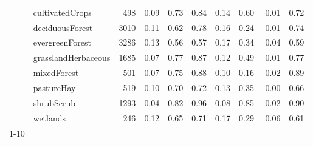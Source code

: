 \begin{tabular}{llrrrrrrrr}
 & cultivatedCrops & 498 & 0.09 & 0.73 & 0.84 & 0.14 & 0.60 & 0.01 & 0.72 \\
 & deciduousForest & 3010 & 0.11 & 0.62 & 0.78 & 0.16 & 0.24 & -0.01 & 0.74 \\
 & evergreenForest & 3286 & 0.13 & 0.56 & 0.57 & 0.17 & 0.34 & 0.04 & 0.59 \\
 & grasslandHerbaceous & 1685 & 0.07 & 0.77 & 0.87 & 0.12 & 0.49 & 0.01 & 0.77 \\
 & mixedForest & 501 & 0.07 & 0.75 & 0.88 & 0.10 & 0.16 & 0.02 & 0.89 \\
 & pastureHay & 519 & 0.10 & 0.70 & 0.72 & 0.13 & 0.35 & 0.00 & 0.66 \\
 & shrubScrub & 1293 & 0.04 & 0.82 & 0.96 & 0.08 & 0.85 & 0.02 & 0.90 \\
 & wetlands & 246 & 0.12 & 0.65 & 0.71 & 0.17 & 0.29 & 0.06 & 0.61 \\
\cline{1-10}
\bottomrule
\end{tabular}
